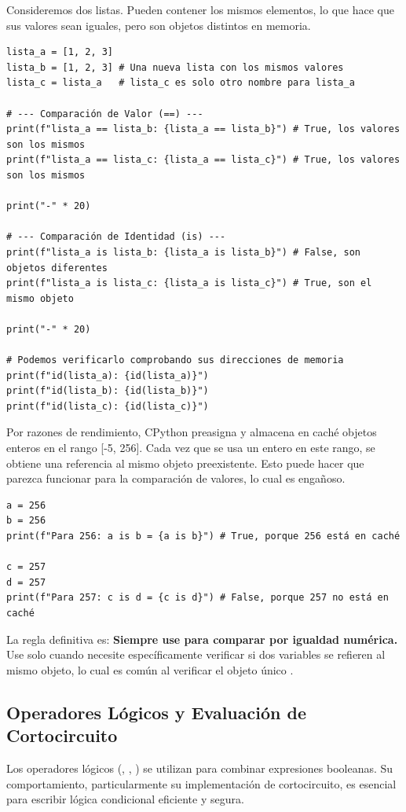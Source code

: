 \begin{example}
Consideremos dos listas. Pueden contener los mismos elementos, lo que hace que sus valores sean iguales, pero son objetos distintos en memoria.
\text{ }\begin{verbatim}
lista_a = [1, 2, 3]
lista_b = [1, 2, 3] # Una nueva lista con los mismos valores
lista_c = lista_a   # lista_c es solo otro nombre para lista_a

# --- Comparación de Valor (==) ---
print(f"lista_a == lista_b: {lista_a == lista_b}") # True, los valores son los mismos
print(f"lista_a == lista_c: {lista_a == lista_c}") # True, los valores son los mismos

print("-" * 20)

# --- Comparación de Identidad (is) ---
print(f"lista_a is lista_b: {lista_a is lista_b}") # False, son objetos diferentes
print(f"lista_a is lista_c: {lista_a is lista_c}") # True, son el mismo objeto

print("-" * 20)

# Podemos verificarlo comprobando sus direcciones de memoria
print(f"id(lista_a): {id(lista_a)}")
print(f"id(lista_b): {id(lista_b)}")
print(f"id(lista_c): {id(lista_c)}")
\end{verbatim}
\end{example}

\begin{remark}
Por razones de rendimiento, CPython preasigna y almacena en caché objetos enteros en el rango [-5, 256]. Cada vez que se usa un entero en este rango, se obtiene una referencia al mismo objeto preexistente. Esto puede hacer que  parezca funcionar para la comparación de valores, lo cual es engañoso.
\text{ }\begin{verbatim}
a = 256
b = 256
print(f"Para 256: a is b = {a is b}") # True, porque 256 está en caché

c = 257
d = 257
print(f"Para 257: c is d = {c is d}") # False, porque 257 no está en caché
\end{verbatim}
La regla definitiva es: \textbf{Siempre use \code{==} para comparar por igualdad numérica.} Use  solo cuando necesite específicamente verificar si dos variables se refieren al mismo objeto, lo cual es común al verificar el objeto único .
\end{remark}

\subsection{Operadores Lógicos y Evaluación de Cortocircuito}
\label{subsec:logical_operators}
Los operadores lógicos (, , ) se utilizan para combinar expresiones booleanas. Su comportamiento, particularmente su implementación de cortocircuito, es esencial para escribir lógica condicional eficiente y segura.

